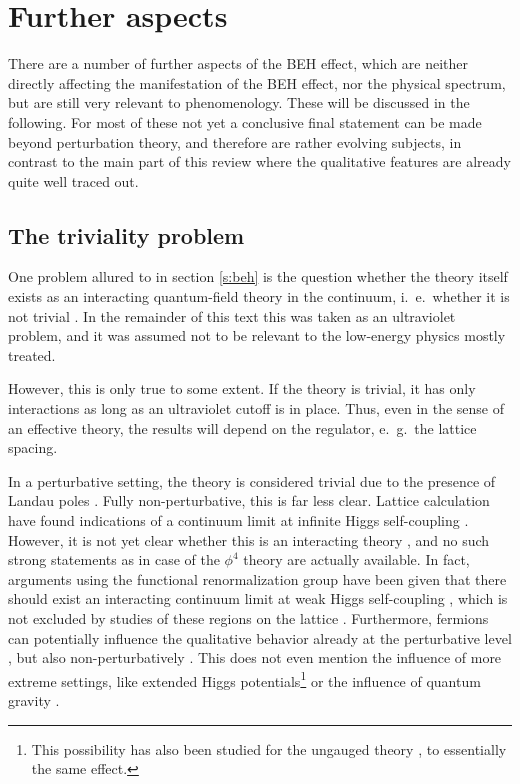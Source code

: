 \documentclass[final,12pt]{article}
\newcommand*{\1}{1\!\!\!\bot}
\begin{document}
\section{Further aspects}\label{s:further}

There are a number of further aspects of the BEH effect, which are neither directly affecting the manifestation of the BEH effect, nor the physical spectrum, but are still very relevant to phenomenology. These will be discussed in the following. For most of these not yet a conclusive final statement can be made beyond perturbation theory, and therefore are rather evolving subjects, in contrast to the main part of this review where the qualitative features are already quite well traced out.

\subsection{The triviality problem}\label{ss:triv}

One problem allured to in section \ref{s:beh} is the question whether the theory itself exists as an interacting quantum-field theory in the continuum, i.\ e.\ whether it is not trivial \cite{Callaway:1988ya}. In the remainder of this text this was taken as an ultraviolet problem, and it was assumed not to be relevant to the low-energy physics mostly treated.

However, this is only true to some extent. If the theory is trivial, it has only interactions as long as an ultraviolet cutoff is in place. Thus, even in the sense of an effective theory, the results will depend on the regulator, e.\ g.\ the lattice spacing.

In a perturbative setting, the theory is considered trivial due to the presence of Landau poles \cite{Callaway:1988ya}. Fully non-perturbative, this is far less clear. Lattice calculation have found indications of a continuum limit at infinite Higgs self-coupling \cite{Bonati:2009pf}. However, it is not yet clear whether this is an interacting theory \cite{Dashen:1983ts,Fernandez:1992jh}, and no such strong statements as in case of the $\phi^4$ theory \cite{Luscher:1987ay,Luscher:1987ek,Hasenfratz:1988kr,Luscher:1988gc,Luscher:1988uq,Zimmermann:1991xx,Heller:1993yv} are actually available. In fact, arguments using the functional renormalization group have been given that there should exist an interacting continuum limit at weak Higgs self-coupling \cite{Gies:2015lia,Gies:2016kkk,Gies:2019nij}, which is not excluded by studies of these regions on the lattice \cite{Wurtz:2013ova,Maas:2014pba}. Furthermore, fermions can potentially influence the qualitative behavior already at the perturbative level \cite{Callaway:1988ya,Litim:2014uca,Litim:2015iea,Bezrukov:2012sa}, but also non-perturbatively \cite{Gies:2013pma}. This does not even mention the influence of more extreme settings, like extended Higgs potentials\footnote{This possibility has also been studied for the ungauged theory \cite{Gies:2014xha,Chu:2015nha,Borchardt:2016xju}, to essentially the same effect.} \cite{Gies:2017zwf} or the influence of quantum gravity \cite{Dona:2013qba,Eichhorn:2016esv,Eichhorn:2017ylw,Gonzalez-Martin:2017bvw}.
\end{document}
